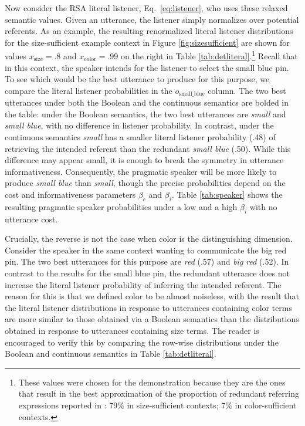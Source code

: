 \documentclass[11pt]{article}
\newcommand{\tableref}[1]{Table \ref{#1}}
\newcommand{\figref}[1]{Figure \ref{#1}}
\begin{document}
Now consider the RSA literal listener, Eq.~\ref{eq:listener}, who uses these relaxed semantic values.
Given an utterance, the listener simply normalizes over potential referents. 
As an example, the resulting renormalized literal listener distributions for the size-sufficient example context in \figref{fig:sizesufficient} are shown for values  $x_{\text{size}} = .8$ and $x_{\text{color}} = .99$ on the right in \tableref{tab:detliteral}.\footnote{These values were chosen for the demonstration because they are the ones that result in the best approximation of the proportion of redundant referring expressions reported in : 79\% in size-sufficient contexts; 7\% in color-sufficient contexts.} Recall that in this context, the speaker intends for the listener to select the small blue pin. To see which would be the best utterance to produce for this purpose, we compare the literal listener probabilities in the $o_{\text{small\_blue}}$ column. The two best utterances under both the Boolean and the continuous semantics are bolded in the table: under the Boolean semantics, the two best utterances are \emph{small} and \emph{small blue}, with no difference in listener probability. In contrast, under the continuous semantics \emph{small} has a smaller literal listener probability (.48) of retrieving the intended referent than the redundant \emph{small blue} (.50). While this difference may appear small, it is enough to break the symmetry in utterance informativeness. Consequently, the pragmatic speaker will be more likely to produce \emph{small blue} than \emph{small}, though the precise probabilities depend on the cost and informativeness parameters $\beta_c$ and $\beta_i$. \tableref{tab:speaker} shows the resulting pragmatic speaker probabilities under a low and a high $\beta_i$ with no utterance cost. 

Crucially, the reverse is not the case when color is the distinguishing dimension. Consider the speaker in the same context wanting to communicate the big red pin. The two best utterances for this purpose are \emph{red} (.57) and \emph{big red} (.52). In contrast to the results for the small blue pin, the redundant  utterance does not increase the literal listener probability of inferring the intended referent. The reason for this is that we defined color to be almost noiseless, with the result that the literal listener distributions in response to utterances containing color terms are more similar to those obtained via a Boolean semantics than the distributions obtained in response to utterances containing size terms. The reader is encouraged to verify this by comparing the row-wise distributions under the  Boolean and continuous semantics in \tableref{tab:detliteral}.
\end{document}

